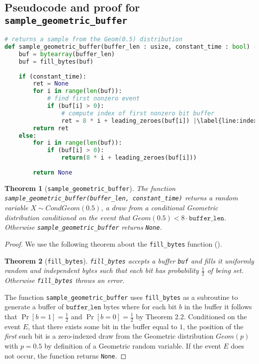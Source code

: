 \documentclass[11pt,a4paper]{article}
\newtheorem{theorem}{Theorem}[section]
\newcommand{\zach}[1]{{ {\color{red}{(zach)~#1}}}}
\theoremstyle{definition}
\begin{document}
\subsection{Pseudocode and proof for \texttt{sample\_geometric\_buffer}}
\begin{lstlisting}[language=Python, escapechar=|]
# returns a sample from the Geom(0.5) distribution
def sample_geometric_buffer(buffer_len : usize, constant_time : bool) -> Optional[uint]: |\label{line:geombuffer}|
    buf = bytearray(buffer_len)
    buf = fill_bytes(buf)
    
    if (constant_time): 
        ret = None
        for i in range(len(buf)):
            # find first nonzero event
            if (buf[i] > 0):
                # compute index of first nonzero bit buffer
                ret = 8 * i + leading_zeroes(buf[i]) |\label{line:indexcmp}|
        return ret
    else:
        for i in range(len(buf)):
            if (buf[i] > 0):
                return(8 * i + leading_zeroes(buf[i]))
        
        return None
\end{lstlisting}

\begin{tcolorbox}
\begin{theorem}[\texttt{sample\_geometric\_buffer}]
The function \texttt{sample\_geometric\_buffer(buffer\_len, constant\_time)} returns a random variable $X \sim CondGeom(0.5)$, a draw from a conditional Geometric distribution conditioned on the event that $Geom(0.5) < 8 \cdot \texttt{buffer\_len}$. Otherwise \texttt{sample\_geometric\_buffer} returns \texttt{None}. 
\end{theorem}
\end{tcolorbox}

\begin{proof}
We use the following theorem about the \texttt{fill\_bytes} function (\zach{insert link for \texttt{fill\_bytes} proof}).  

\begin{tcolorbox}
\begin{theorem}[\texttt{fill\_bytes}]
\texttt{fill\_bytes} accepts a buffer \texttt{buf} and fills it uniformly random and independent bytes such that each bit has probability $\frac{1}{2}$ of being set. Otherwise \texttt{fill\_bytes} throws an error. 
\end{theorem}
\end{tcolorbox}

The function \texttt{sample\_geometric\_buffer} uses \texttt{fill\_bytes}  as a subroutine to generate a buffer of $\texttt{buffer\_len}$ bytes where for each bit $b$ in the buffer it follows that $\Pr[b = 1] = \frac{1}{2}$ and $\Pr[b = 0] = \frac{1}{2}$ by Theorem 2.2. Conditioned on the event $E$, that there exists some bit in the buffer equal to $1$, the position of the \emph{first} such bit is a zero-indexed draw from the Geometric distribution $Geom(p)$ with $p = 0.5$ by definition of a Geometric random variable. If the event $E$ does not occur, the function returns \texttt{None}. 
\end{proof}
\end{document}

